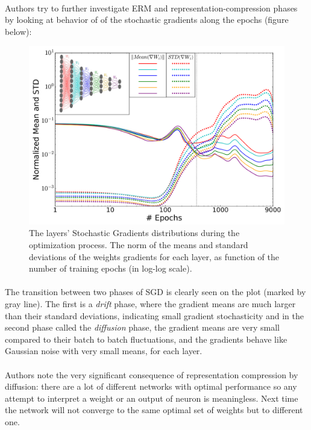\documentclass[a4paper,14pt]{extarticle}
\begin{document}
\paragraph{}
Authors try to further investigate ERM and representation-compression phases by looking at behavior of of the stochastic gradients along the epochs (figure below\cite{shwartz2017opening}):
\begin{figure}[!h]
	\centering
	\includegraphics[width=\textwidth]{SGD.png}
	\caption{The layers’ Stochastic Gradients distributions during the optimization process. The norm of the means and standard deviations of the weights gradients for each layer, as function of the number of training epochs (in log-log scale).}
\end{figure}
\paragraph{}
The transition between two phases of SGD is clearly seen on the plot (marked by gray line). The first is a \textit{drift} phase, where the gradient means are much larger than their standard deviations, indicating small gradient stochasticity and in the second phase called the \textit{diffusion} phase, the gradient means are very small compared to their batch to batch fluctuations, and the gradients behave like Gaussian noise with very small means, for each layer.
\paragraph{}
Authors note the very significant consequence of representation compression by diffusion: there are a lot of different networks with optimal performance so any attempt to interpret a weight or an output of neuron is meaningless. Next time the network will not converge to the same optimal set of weights but to different one.
\end{document}
